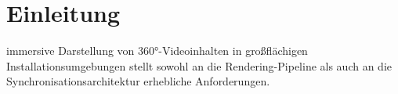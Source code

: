 
\section{Einleitung}
\label{sec:introduction}

 immersive Darstellung von 360°-Videoinhalten
in großflächigen Installationsumgebungen stellt sowohl an die
Rendering-Pipeline als auch an die Synchronisationsarchitektur
erhebliche Anforderungen.


